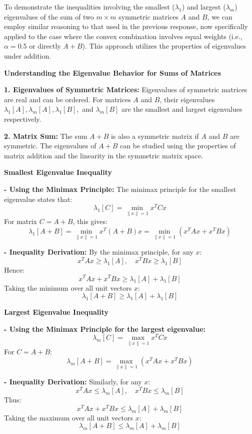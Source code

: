 \documentclass[8pt]{article}
\begin{document}
{{To demonstrate the inequalities involving the smallest (\(\lambda_1\)) and largest (\(\lambda_m\)) eigenvalues of the sum of two \(m \times m\) symmetric matrices \(A\) and \(B\), we can employ similar reasoning to that used in the previous response, now specifically applied to the case where the convex combination involves equal weights (i.e., \(\alpha = 0.5\) or directly \(A + B\)). This approach utilizes the properties of eigenvalues under addition.

\textbf{Understanding the Eigenvalue Behavior for Sums of Matrices}

\textbf{1. Eigenvalues of Symmetric Matrices:}
   Eigenvalues of symmetric matrices are real and can be ordered. For matrices \(A\) and \(B\), their eigenvalues \(\lambda_1[A], \lambda_m[A], \lambda_1[B],\) and \(\lambda_m[B]\) are the smallest and largest eigenvalues respectively.

\textbf{2. Matrix Sum:}
   The sum \(A + B\) is also a symmetric matrix if \(A\) and \(B\) are symmetric. The eigenvalues of \(A + B\) can be studied using the properties of matrix addition and the linearity in the symmetric matrix space.

\textbf{Smallest Eigenvalue Inequality}

\textbf{- Using the Minimax Principle:}
   The minimax principle for the smallest eigenvalue states that:
   \[
   \lambda_1[C] = \min_{\|x\| = 1} x^T C x
   \]
   For matrix \(C = A + B\), this gives:
   \[
   \lambda_1[A+B] = \min_{\|x\| = 1} x^T (A+B) x = \min_{\|x\| = 1} (x^T A x + x^T B x)
   \]

\textbf{- Inequality Derivation:}
   By the minimax principle, for any \(x\):
   \[
   x^T A x \geq \lambda_1[A], \quad x^T B x \geq \lambda_1[B]
   \]
   Hence:
   \[
   x^T A x + x^T B x \geq \lambda_1[A] + \lambda_1[B]
   \]
   Taking the minimum over all unit vectors \(x\):
   \[
   \lambda_1[A + B] \geq \lambda_1[A] + \lambda_1[B]
   \]

\textbf{Largest Eigenvalue Inequality}

\textbf{- Using the Minimax Principle for the largest eigenvalue:}
   \[
   \lambda_m[C] = \max_{\|x\| = 1} x^T C x
   \]
   For \(C = A + B\):
   \[
   \lambda_m[A+B] = \max_{\|x\| = 1} (x^T A x + x^T B x)
   \]

\textbf{- Inequality Derivation:}
   Similarly, for any \(x\):
   \[
   x^T A x \leq \lambda_m[A], \quad x^T B x \leq \lambda_m[B]
   \]
   Thus:
   \[
   x^T A x + x^T B x \leq \lambda_m[A] + \lambda_m[B]
   \]
   Taking the maximum over all unit vectors \(x\):
   \[
   \lambda_m[A + B] \leq \lambda_m[A] + \lambda_m[B]
   \]


}}
\end{document}
